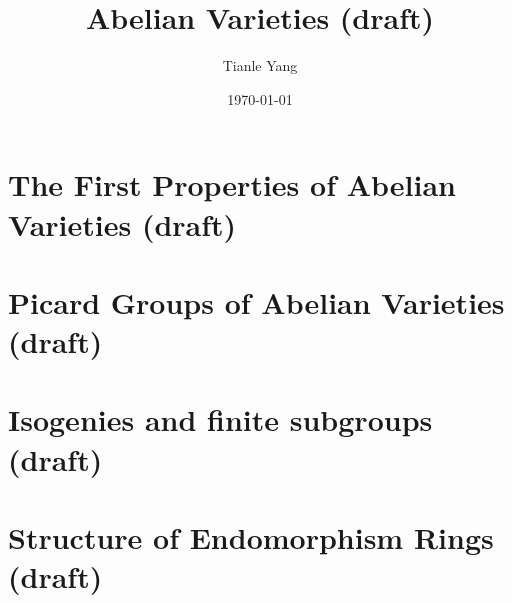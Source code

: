 \documentclass[sectionlevel=chapter]{noteformyself}
\title{Abelian Varieties (draft)}
\author{Tianle Yang}
\date{\today}
\begin{document}
    \maketitle

    \tableofcontents

    \section{The First Properties of Abelian Varieties (draft)}
    
    \section{Picard Groups of Abelian Varieties (draft)}
    
    \section{Isogenies and finite subgroups (draft)}
    
    \section{Structure of Endomorphism Rings (draft)}
    

\end{document}
